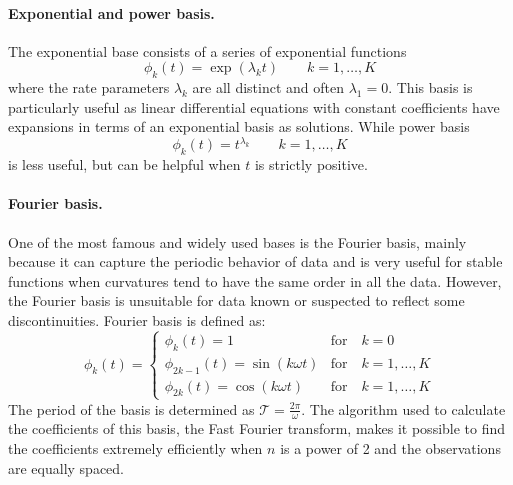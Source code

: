 \paragraph{Exponential and power basis.} The exponential base consists of a series of exponential functions 
\begin{equation}
    \label{eq:exponential}
    \phi_k(t)=\exp (\lambda_kt) \qquad k=1,\dots, K
\end{equation}
where the rate parameters $\lambda_k$ are all distinct and often $\lambda_1=0$. This basis is particularly useful as linear differential equations with constant coefficients have expansions in terms of an exponential basis as solutions. While power basis
\begin{equation}
    \label{eq:power}
    \phi_k(t)=t^{\lambda_k} \qquad k=1,\dots, K
\end{equation}
is less useful, but can be helpful when $t$ is strictly positive.
\paragraph{Fourier basis.} One of the most famous and widely used bases is the Fourier basis, mainly because it can capture the periodic behavior of data and is very useful for stable functions when curvatures tend to have the same order in all the data. However, the Fourier basis is unsuitable for data known or suspected to reflect some discontinuities. Fourier basis is defined as:
\begin{equation}
    \label{eq:fourier}
    \phi_k(t)=\left\{ \begin{array}{ll}
         \phi_k(t)=1 & \text{for} \quad k = 0 \\
         \phi_{2k-1}(t)= \sin(k\omega t) & \text{for} \quad k = 1, \dots, K \\
         \phi_{2k}(t)= \cos(k\omega t) & \text{for} \quad k = 1, \dots, K
    \end{array}\right.
\end{equation}
The period of the basis is determined as $\mathcal{T}=\frac{2\pi}{\omega}$. The algorithm used to calculate the coefficients of this basis, the Fast Fourier transform, makes it possible to find the coefficients extremely efficiently when $n$ is a power of 2 and the observations are equally spaced.
